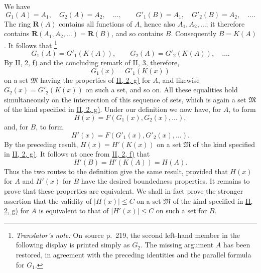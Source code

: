 \documentclass[12pt,b5paper,twoside]{article}
\newcommand{\translatorfootnote}[2]{%
  \begingroup
  \renewcommand{\thefootnote}{#1}%
  \footnote{\hspace{0.8em}\textit{Translator's note:} #2}%
  \endgroup}
\begin{document}
We have
\[
 G_1(A)=A_1,\quad G_2(A)=A_2,\quad\ldots,
 \qquad
 G'_1(B)=A_1,\quad G'_2(B)=A_2,\quad\ldots.
\]
The ring $\mathbf R(A)$ contains all functions of $A$, hence also
$A_1,A_2,\ldots$; it therefore contains
$\mathbf R(A_1,A_2,\ldots)=\mathbf R(B)$, and so contains $B$.  Consequently
$B=K(A)$.  It follows that\translatorfootnote{T12}{On source p.~219, the second
left-hand member in the following display is printed simply as $G_2$.  The missing
argument $A$ has been restored, in agreement with the preceding identities and the
parallel formula for $G_1$.}
\[
 G_1(A)=G'_1(K(A)),\qquad G_2(A)=G'_2(K(A)),\quad\ldots.
\]
By \hyperref[sec:II.2]{II, 2, f)} and the concluding remark of
\hyperref[sec:II.3]{II, 3}, therefore,
\[
 G_1(x)=G'_1(K(x))
\]
on a set $\mathfrak{M}$ having the properties of \hyperref[sec:II.2]{II, 2, g)} for
$A$, and likewise $G_2(x)=G'_2(K(x))$ on such a set, and so on.  All these equalities
hold simultaneously on the intersection of this sequence of sets, which is again a
set $\mathfrak{M}$ of the kind specified in \hyperref[sec:II.2]{II, 2, g)}.  Under our
definition we now have, for $A$, to form
\[
 H(x)=F(G_1(x),G_2(x),\ldots),
\]
and, for $B$, to form
\[
 H'(x)=F(G'_1(x),G'_2(x),\ldots).
\]
By the preceding result, $H(x)=H'(K(x))$ on a set $\mathfrak{M}$ of the kind
specified in \hyperref[sec:II.2]{II, 2, g)}.  It follows at once from
\hyperref[sec:II.2]{II, 2, f)} that
\[
 H'(B)=H'(K(A))=H(A).
\]
Thus the two routes to the definition give the same result, provided that $H(x)$ for
$A$ and $H'(x)$ for $B$ have the desired boundedness properties.  It remains to prove
that these properties are equivalent.  We shall in fact prove the stronger assertion
that the validity of $|H(x)|\leq C$ on a set $\mathfrak{M}$ of the kind specified in
\hyperref[sec:II.2]{II, 2, g)} for $A$ is equivalent to that of
$|H'(x)|\leq C$ on such a set for $B$.
\end{document}
